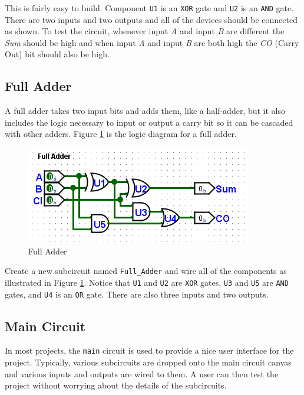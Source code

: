 This is fairly easy to build. Component \texttt{U1} is an \texttt{XOR} gate and \texttt{U2} is an \texttt{AND} gate. There are two inputs and two outputs and all of the devices should be connected as shown. To test the circuit, whenever input \textit{A} and input \textit{B} are different the \textit{Sum} should be high and when input \textit{A} and input \textit{B} are both high the \textit{CO} (Carry Out) bit should also be high.

\subsection{Full Adder}

A full adder takes two input bits and adds them, like a half-adder, but it also includes the logic necessary to input or output a carry bit so it can be cascaded with other adders. Figure \ref{fig:add-02} is the logic diagram for a full adder.

\begin{figure}[H]
	\centering
	\includegraphics[width=\maxwidth{.95\linewidth}]{gfx/add-02}
	\caption{Full Adder}
	\label{fig:add-02}
\end{figure}

Create a new subcircuit named \lstinline[columns=fixed]|Full_Adder| and wire all of the components as illustrated in Figure \ref{fig:add-02}. Notice that \texttt{U1} and \texttt{U2} are \texttt{XOR} gates, \texttt{U3} and \texttt{U5} are \texttt{AND} gates, and \texttt{U4} is an \texttt{OR} gate. There are also three inputs and two outputs.

\subsection{Main Circuit}

In most \LE projects, the \lstinline[columns=fixed]|main| circuit is used to provide a nice user interface for the project. Typically, various subcircuits are dropped onto the main circuit canvas and various inputs and outputs are wired to them. A user can then test the project without worrying about the details of the subcircuits.


